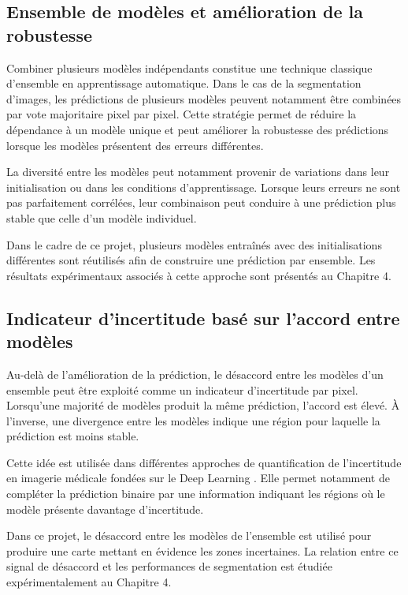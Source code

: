 \documentclass[12pt,a4paper]{report}
\begin{document}
\subsection{Ensemble de modèles et amélioration de la robustesse}

Combiner plusieurs modèles indépendants constitue une technique classique d'ensemble en apprentissage automatique. Dans le cas de la segmentation d'images, les prédictions de plusieurs modèles peuvent notamment être combinées par vote majoritaire pixel par pixel. Cette stratégie permet de réduire la dépendance à un modèle unique et peut améliorer la robustesse des prédictions lorsque les modèles présentent des erreurs différentes.

La diversité entre les modèles peut notamment provenir de variations dans leur initialisation ou dans les conditions d'apprentissage. Lorsque leurs erreurs ne sont pas parfaitement corrélées, leur combinaison peut conduire à une prédiction plus stable que celle d'un modèle individuel.

Dans le cadre de ce projet, plusieurs modèles entraînés avec des initialisations différentes sont réutilisés afin de construire une prédiction par ensemble. Les résultats expérimentaux associés à cette approche sont présentés au Chapitre 4.

\subsection{Indicateur d'incertitude basé sur l'accord entre modèles}

Au-delà de l'amélioration de la prédiction, le désaccord entre les modèles d'un ensemble peut être exploité comme un indicateur d'incertitude par pixel. Lorsqu'une majorité de modèles produit la même prédiction, l'accord est élevé. À l'inverse, une divergence entre les modèles indique une région pour laquelle la prédiction est moins stable.

Cette idée est utilisée dans différentes approches de quantification de l'incertitude en imagerie médicale fondées sur le Deep Learning \cite{ref19,ref20}. Elle permet notamment de compléter la prédiction binaire par une information indiquant les régions où le modèle présente davantage d'incertitude.

Dans ce projet, le désaccord entre les modèles de l'ensemble est utilisé pour produire une carte mettant en évidence les zones incertaines. La relation entre ce signal de désaccord et les performances de segmentation est étudiée expérimentalement au Chapitre 4.
\end{document}
